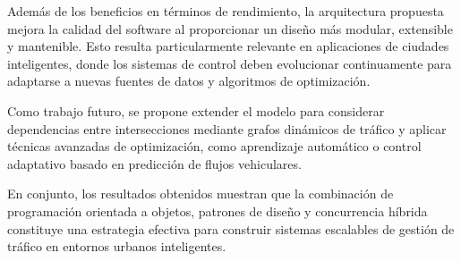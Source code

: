 \documentclass[12pt]{article}
\begin{document}
Además de los beneficios en términos de rendimiento, la arquitectura
propuesta mejora la calidad del software al proporcionar un diseño
más modular, extensible y mantenible. Esto resulta particularmente
relevante en aplicaciones de ciudades inteligentes, donde los sistemas
de control deben evolucionar continuamente para adaptarse a nuevas
fuentes de datos y algoritmos de optimización.

Como trabajo futuro, se propone extender el modelo para considerar
dependencias entre intersecciones mediante grafos dinámicos de tráfico
y aplicar técnicas avanzadas de optimización, como aprendizaje
automático o control adaptativo basado en predicción de flujos
vehiculares.

En conjunto, los resultados obtenidos muestran que la combinación de
programación orientada a objetos, patrones de diseño y concurrencia
híbrida constituye una estrategia efectiva para construir sistemas
escalables de gestión de tráfico en entornos urbanos inteligentes.
\end{document}
